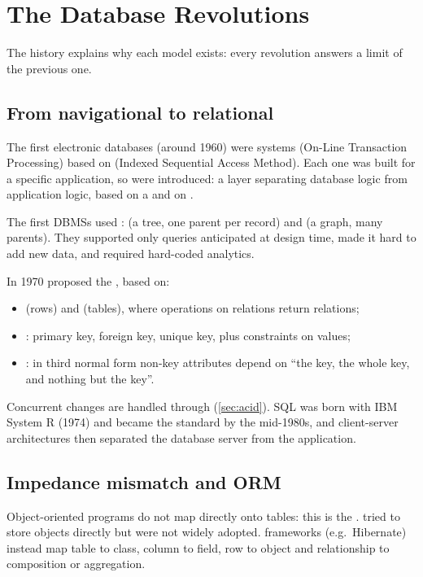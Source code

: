 \section{The Database Revolutions}

The history explains why each model exists: every revolution answers a limit of the previous one.

\subsection{From navigational to relational}
The first electronic databases (around 1960) were  systems (On-Line Transaction Processing) based on  (Indexed Sequential Access Method). Each one was built for a specific application, so  were introduced: a layer separating database logic from application logic, based on a  and on .

The first DBMSs used :  (a tree, one parent per record) and  (a graph, many parents). They supported only queries anticipated at design time, made it hard to add new data, and required hard-coded analytics.

In 1970  proposed the , based on:
\begin{itemize}
  \item {} (rows) and  (tables), where operations on relations return relations;
  \item {}: primary key, foreign key, unique key, plus constraints on values;
  \item {}: in third normal form non-key attributes depend on ``the key, the whole key, and nothing but the key''.
\end{itemize}
Concurrent changes are handled through  (\cref{sec:acid}). SQL was born with IBM System R (1974) and became the standard by the mid-1980s, and client-server architectures then separated the database server from the application.

\subsection{Impedance mismatch and ORM}
Object-oriented programs do not map directly onto tables: this is the .  tried to store objects directly but were not widely adopted.  frameworks (e.g.\ Hibernate) instead map table to class, column to field, row to object and relationship to composition or aggregation.

